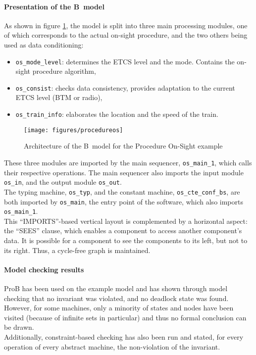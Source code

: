\paragraph{Presentation of the B~model}
As shown in figure \ref{fig:procos}, the model is split into three main processing modules, one of which corresponds to the actual on-sight procedure,
and the two others being used as data conditioning:
\begin{itemize}
\item \verb+os_mode_level+: determines the ETCS level and the mode. Contains the on-sight procedure algorithm,
\item \verb+os_consist+: checks data consistency, provides adaptation to the current ETCS level (BTM or radio),
\item \verb+os_train_info+: elaborates the location and the speed of the train.
\end{itemize}

\begin{figure}[h!]
\centering
\texttt{[image: figures/procedureos]}
\caption{Architecture of the B~model for the Procedure On-Sight example}
\label{fig:procos}
\end{figure}

These three modules are imported by the main sequencer, \verb+os_main_1+, which calls their respective operations. The main sequencer also imports the input module \verb+os_in+, and the output module \verb+os_out+.\\
The typing machine, \verb+os_typ+, and the constant machine, \verb+os_cte_conf_bs+, are both imported by \verb+os_main+, the entry point of the software, which also imports \verb+os_main_1+.\\
 
This ``IMPORTS''-based vertical layout is complemented by a horizontal aspect: the ``SEES'' clause, which enables a component to access another component's data. It is possible for a component to see the components to its left, but not to its right. Thus, a cycle-free graph is maintained.
 
\paragraph{Model checking results}
\label{subapp:mc}
ProB has been used on the example model and has shown through model checking that no invariant was violated, and no deadlock state was found. However, for some machines, only a minority of states and nodes have been visited (because of infinite sets in particular) and thus no formal conclusion can be drawn.\\
Additionally, constraint-based checking has also been run and stated, for every operation of every abstract machine, the non-violation of the invariant.

